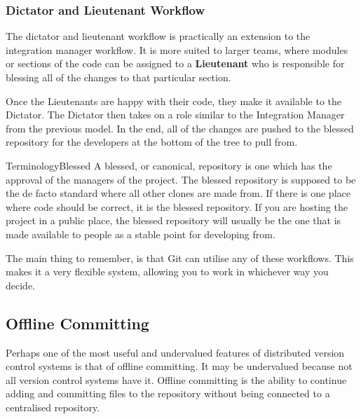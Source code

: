 
\subsubsection{Dictator and Lieutenant Workflow}
The dictator and lieutenant workflow is practically an extension to the integration manager workflow.
It is more suited to larger teams, where modules or sections of the code can be assigned to a \textbf{Lieutenant} who is responsible for blessing all of the changes to that particular section.

Once the Lieutenants are happy with their code, they make it available to the Dictator.
The Dictator then takes on a role similar to the Integration Manager from the previous model.
In the end, all of the changes are pushed to the blessed repository for the developers at the bottom of the tree to pull from.


\begin{callout}{Terminology}{Blessed}
A blessed, or canonical, repository is one which has the approval of the managers of the project.
The blessed repository is supposed to be the de facto standard where all other clones are made from.
If there is one place where code should be correct, it is the blessed repository.
If you are hosting the project in a public place, the blessed repository will usually be the one that is made available to people as a stable point for developing from.
\end{callout}

The main thing to remember, is that Git can utilise any of these workflows.
This makes it a very flexible system, allowing you to work in whichever way you decide.

\subsection{Offline Committing}
Perhaps one of the most useful and undervalued features of distributed version control systems is that of offline committing.
It may be undervalued because not all version control systems have it.
Offline committing is the ability to continue adding and committing files to the repository without being connected to a centralised repository.

